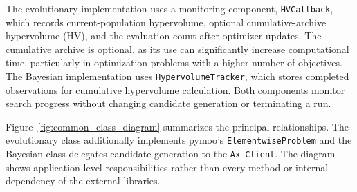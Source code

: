 The evolutionary implementation uses a monitoring component, \texttt{HVCallback}, which records current-population hypervolume, optional
cumulative-archive hypervolume (HV), and the evaluation count after optimizer updates. The cumulative archive is optional, as its use can significantly
increase computational time, particularly in optimization problems with a higher number of objectives. The Bayesian implementation uses
\texttt{HypervolumeTracker}, which stores completed observations for cumulative hypervolume calculation. Both components monitor search progress
without changing candidate generation or terminating a run.

Figure~\ref{fig:common_class_diagram} summarizes the principal relationships.
The evolutionary class additionally implements pymoo's \texttt{ElementwiseProblem} and
the Bayesian class delegates candidate generation to the \texttt{Ax Client}.
The diagram shows application-level responsibilities rather than every method
or internal dependency of the external libraries.

